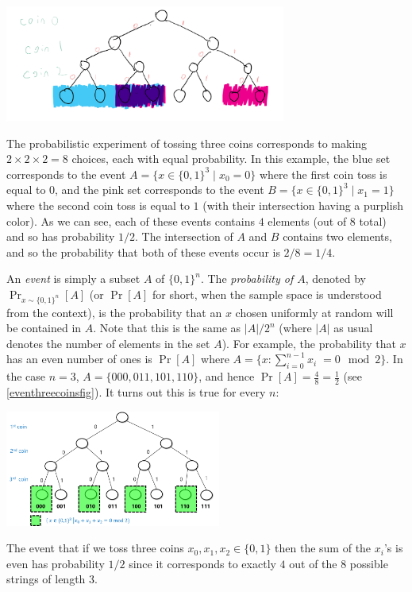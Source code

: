 \begin{marginfigure}
\centering
\includegraphics[width=\linewidth, height=1.5in, keepaspectratio]{../figure/coinexperiment.png}
\caption{The probabilistic experiment of tossing three coins corresponds
to making \(2\times 2 \times 2 = 8\) choices, each with equal
probability. In this example, the blue set corresponds to the event
\(A = \{ x\in \{0,1\}^3 \;|\; x_0 = 0 \}\) where the first coin toss is
equal to \(0\), and the pink set corresponds to the event
\(B = \{ x\in \{0,1\}^3 \;|\; x_1 = 1 \}\) where the second coin toss is
equal to \(1\) (with their intersection having a purplish color). As we
can see, each of these events contains \(4\) elements (out of \(8\)
total) and so has probability \(1/2\). The intersection of \(A\) and
\(B\) contains two elements, and so the probability that both of these
events occur is \(2/8 = 1/4\).}
\label{coinexperimentfig}
\end{marginfigure}

An \emph{event} is simply a subset \(A\) of \(\{0,1\}^n\). The
\emph{probability of \(A\)}, denoted by \(\Pr_{x\sim \{0,1\}^n}[A]\) (or
\(\Pr[A]\) for short, when the sample space is understood from the
context), is the probability that an \(x\) chosen uniformly at random
will be contained in \(A\). Note that this is the same as \(|A|/2^n\)
(where \(|A|\) as usual denotes the number of elements in the set
\(A\)). For example, the probability that \(x\) has an even number of
ones is \(\Pr[A]\) where
\(A=\{ x : \sum_{i=0}^{n-1} x_i \;= 0 \mod 2 \}\). In the case \(n=3\),
\(A=\{ 000,011,101,110 \}\), and hence
\(\Pr[A]=\tfrac{4}{8}=\tfrac{1}{2}\) (see \cref{eventhreecoinsfig}). It
turns out this is true for every \(n\):


\begin{marginfigure}
\centering
\includegraphics[width=\linewidth, height=1.5in, keepaspectratio]{../figure/even3coins.png}
\caption{The event that if we toss three coins
\(x_0,x_1,x_2 \in \{0,1\}\) then the sum of the \(x_i\)'s is even has
probability \(1/2\) since it corresponds to exactly \(4\) out of the
\(8\) possible strings of length \(3\).}
\label{eventhreecoinsfig}
\end{marginfigure}

